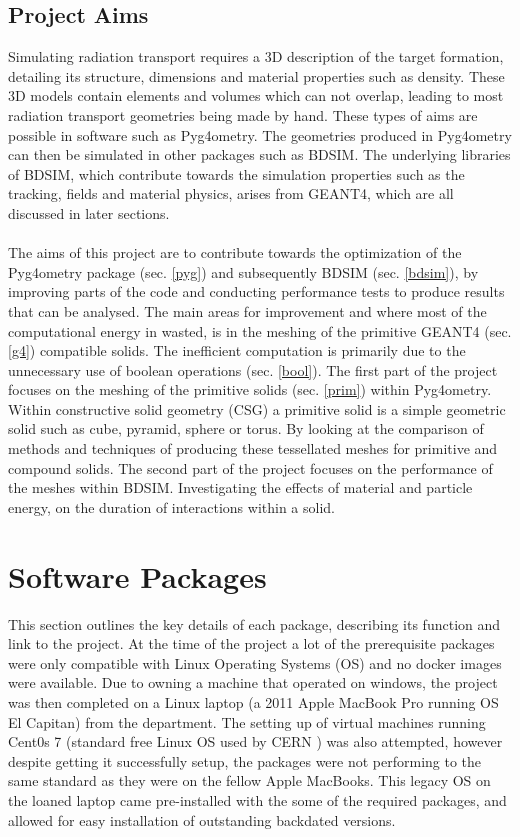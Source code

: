 \documentclass[12pt,a4paper]{article}
\begin{document}
\subsection{Project Aims}
\label{aim}
Simulating radiation transport requires a 3D description of the target formation, detailing its structure, dimensions and material properties such as density. These 3D models contain elements and volumes which can not overlap, leading to most radiation transport geometries being made by hand. These types of aims are possible in software such as Pyg4ometry. The geometries produced in Pyg4ometry can then be simulated in other packages such as BDSIM. The underlying libraries of BDSIM, which contribute towards the simulation properties such as the tracking, fields and material physics, arises from GEANT4, which are all discussed in later sections.
\\\\
\noindent The aims of this project are to contribute towards the optimization of the Pyg4ometry package (sec. \ref{pyg}) and subsequently BDSIM (sec. \ref{bdsim}), by improving parts of the code and conducting performance tests to produce results that can be analysed. The main areas for improvement and where most of the computational energy in wasted, is in the meshing of the primitive GEANT4 (sec. \ref{g4}) compatible solids. The inefficient computation is primarily due to the unnecessary use of boolean operations (sec. \ref{bool}). The first part of the project focuses on the meshing of the primitive solids (sec. \ref{prim}) within Pyg4ometry. Within constructive solid geometry (CSG) a primitive solid is a simple geometric solid such as cube, pyramid, sphere or torus. By looking at the comparison of methods and techniques of producing these tessellated meshes for primitive and compound solids. The second part of the project focuses on the performance of the meshes within BDSIM. Investigating the effects of material and particle energy, on the duration of interactions within a solid.


\section{Software Packages}
\label{packs}
This section outlines the key details of each package, describing its function and link to the project. At the time of the project a lot of the prerequisite packages were only compatible with Linux Operating Systems (OS) and no docker images were available. Due to owning a machine that operated on windows, the project was then completed on a Linux laptop (a 2011 Apple MacBook Pro running OS El Capitan) from the department. The setting up of virtual machines running Cent0s 7 (standard free Linux OS used by CERN \cite{cern}) was also attempted, however despite getting it successfully setup, the packages were not performing to the same standard as they were on the fellow Apple MacBooks. This legacy OS on the loaned laptop came pre-installed with the some of the required packages, and allowed for easy installation of outstanding backdated versions. 
\end{document}
